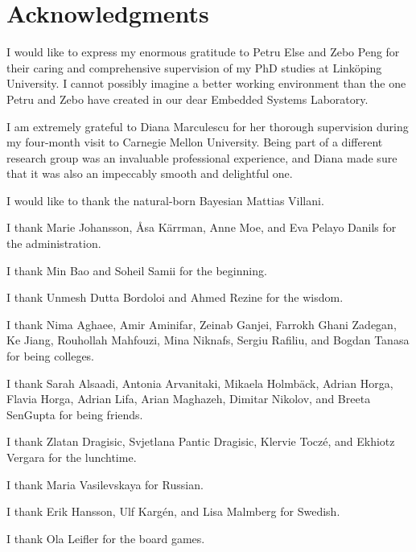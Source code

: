 \chapter*{Acknowledgments}
\newcommand\person[2]{#2 #1}

I would like to express my enormous gratitude to \person{Else}{Petru} and
\person{Peng}{Zebo} for their caring and comprehensive supervision of my PhD
studies at Linköping University. I cannot possibly imagine a better working
environment than the one Petru and Zebo have created in our dear Embedded
Systems Laboratory.

I am extremely grateful to \person{Marculescu}{Diana} for her thorough
supervision during my four-month visit to Carnegie Mellon University. Being part
of a different research group was an invaluable professional experience, and
Diana made sure that it was also an impeccably smooth and delightful one.

I would like to thank the natural-born Bayesian \person{Villani}{Mattias}.

I thank
\person{Johansson}{Marie},
\person{Kärrman}{Åsa},
\person{Moe}{Anne}, and
\person{Pelayo Danils}{Eva}
for the administration.

I thank
\person{Bao}{Min} and
\person{Samii}{Soheil}
for the beginning.

I thank
\person{Dutta Bordoloi}{Unmesh} and
\person{Rezine}{Ahmed}
for the wisdom.

I thank
\person{Aghaee}{Nima},
\person{Aminifar}{Amir},
\person{Ganjei}{Zeinab},
\person{Ghani Zadegan}{Farrokh},
\person{Jiang}{Ke},
\person{Mahfouzi}{Rouhollah},
\person{Niknafs}{Mina},
\person{Rafiliu}{Sergiu}, and
\person{Tanasa}{Bogdan}
for being colleges.

I thank
\person{Alsaadi}{Sarah},
\person{Arvanitaki}{Antonia},
\person{Holmbäck}{Mikaela},
\person{Horga}{Adrian},
\person{Horga}{Flavia},
\person{Lifa}{Adrian},
\person{Maghazeh}{Arian},
\person{Nikolov}{Dimitar}, and
\person{SenGupta}{Breeta}
for being friends.

I thank
\person{Dragisic}{Zlatan},
\person{Pantic Dragisic}{Svjetlana},
\person{Toczé}{Klervie}, and
\person{Vergara}{Ekhiotz}
for the lunchtime.

I thank
\person{Vasilevskaya}{Maria}
for Russian.

I thank
\person{Hansson}{Erik},
\person{Kargén}{Ulf}, and
\person{Malmberg}{Lisa}
for Swedish.

I thank
\person{Leifler}{Ola}
for the board games.
